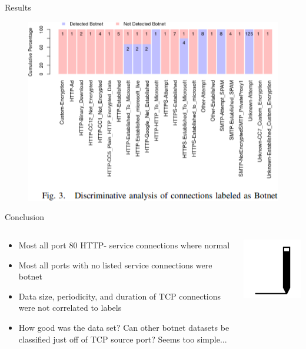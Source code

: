 \documentclass[pdf]{beamer}
\begin{document}
\begin{frame}[fragile]{Results}
\begin{figure}
\includegraphics[width=.9\linewidth,keepaspectratio]{Images/botnet_results.png}
\end{figure}
\end{frame}


\begin{frame}[fragile]{Conclusion}
\begin{minipage}[0.2\textheight]{\textwidth}
\begin{columns}[T]
\begin{column}{0.5\textwidth}
\begin{itemize}
\item Most all port 80 HTTP- service connections where normal
\item Most all ports with no listed service connections were botnet
\item Data size, periodicity, and duration of TCP connections were not correlated to labels
\item How good was the data set? Can other botnet datasets be classified just off of TCP source port? Seems too simple...
\end{itemize}
\end{column}
\begin{column}{0.5\textwidth}
\includegraphics[width=5cm]{Images/conclusion.png}
\end{column}
\end{columns}
\end{minipage}
\end{frame}
\end{document}
